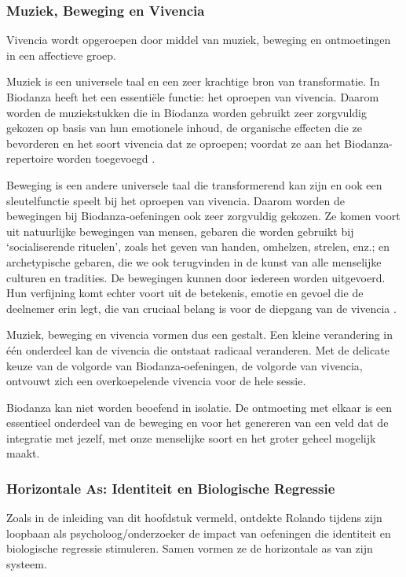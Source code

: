 \documentclass[
  11pt,
]{book}
\begin{document}
\subsubsection{Muziek, Beweging en Vivencia}\label{muziek-beweging-en-vivencia}

Vivencia wordt opgeroepen door middel van muziek, beweging en ontmoetingen in een affectieve groep.

Muziek is een universele taal en een zeer krachtige bron van transformatie. In Biodanza heeft het een essentiële functie: het oproepen van vivencia. Daarom worden de muziekstukken die in Biodanza worden gebruikt zeer zorgvuldig gekozen op basis van hun emotionele inhoud, de organische effecten die ze bevorderen en het soort vivencia dat ze oproepen; voordat ze aan het Biodanza-repertoire worden toegevoegd \citep{toro2008}.

Beweging is een andere universele taal die transformerend kan zijn en ook een sleutelfunctie speelt bij het oproepen van vivencia. Daarom worden de bewegingen bij Biodanza-oefeningen ook zeer zorgvuldig gekozen. Ze komen voort uit natuurlijke bewegingen van mensen, gebaren die worden gebruikt bij `socialiserende rituelen', zoals het geven van handen, omhelzen, strelen, enz.; en archetypische gebaren, die we ook terugvinden in de kunst van alle menselijke culturen en tradities. De bewegingen kunnen door iedereen worden uitgevoerd. Hun verfijning komt echter voort uit de betekenis, emotie en gevoel die de deelnemer erin legt, die van cruciaal belang is voor de diepgang van de vivencia \citep{toro2008}.

Muziek, beweging en vivencia vormen dus een gestalt. Een kleine verandering in één onderdeel kan de vivencia die ontstaat radicaal veranderen. Met de delicate keuze van de volgorde van Biodanza-oefeningen, de volgorde van vivencia, ontvouwt zich een overkoepelende vivencia voor de hele sessie.

Biodanza kan niet worden beoefend in isolatie. De ontmoeting met elkaar is een essentieel onderdeel van de beweging en voor het genereren van een veld dat de integratie met jezelf, met onze menselijke soort en het groter geheel mogelijk maakt.

\subsubsection{Horizontale As: Identiteit en Biologische Regressie}\label{horizontale-as-identiteit-en-biologische-regressie}

Zoals in de inleiding van dit hoofdstuk vermeld, ontdekte Rolando tijdens zijn loopbaan als psycholoog/onderzoeker de impact van oefeningen die identiteit en biologische regressie stimuleren. Samen vormen ze de horizontale as van zijn systeem.
\end{document}
